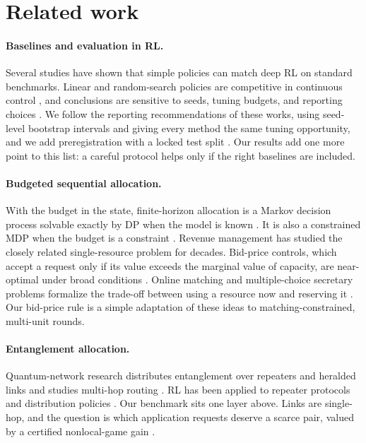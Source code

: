 \documentclass[10pt]{article}
\begin{document}
\section{Related work}\label{sec:related}

\paragraph{Baselines and evaluation in RL.} Several studies have shown that simple policies can match deep RL on standard benchmarks. Linear and random-search policies are competitive in continuous control \citep{rajeswaran2017towards,mania2018simple}, and conclusions are sensitive to seeds, tuning budgets, and reporting choices \citep{henderson2018deep,agarwal2021deep,patterson2024empirical}. We follow the reporting recommendations of these works, using seed-level bootstrap intervals and giving every method the same tuning opportunity, and we add preregistration with a locked test split \citep{nosek2018preregistration}. Our results add one more point to this list: a careful protocol helps only if the right baselines are included.

\paragraph{Budgeted sequential allocation.} With the budget in the state, finite-horizon allocation is a Markov decision process solvable exactly by DP when the model is known \citep{puterman1994markov,bertsekas2017dynamic}. It is also a constrained MDP when the budget is a constraint \citep{altman1999constrained}. Revenue management has studied the closely related single-resource problem for decades. Bid-price controls, which accept a request only if its value exceeds the marginal value of capacity, are near-optimal under broad conditions \citep{gallego1994optimal,talluri2004theory,adelman2007dynamic}. Online matching and multiple-choice secretary problems formalize the trade-off between using a resource now and reserving it \citep{kleinberg2005multiple,feldman2009online}. Our bid-price rule is a simple adaptation of these ideas to matching-constrained, multi-unit rounds.

\paragraph{Entanglement allocation.} Quantum-network research distributes entanglement over repeaters and heralded links \citep{kimble2008quantum,wehner2018quantum,briegel1998quantum,bernien2013heralded} and studies multi-hop routing \citep{pant2019routing,shi2020concurrent}. RL has been applied to repeater protocols and distribution policies \citep{haldar2023fast,li2024optimising}. Our benchmark sits one layer above. Links are single-hop, and the question is which application requests deserve a scarce pair, valued by a certified nonlocal-game gain \citep{cleve2004consequences,brunner2014bell}.
\end{document}
